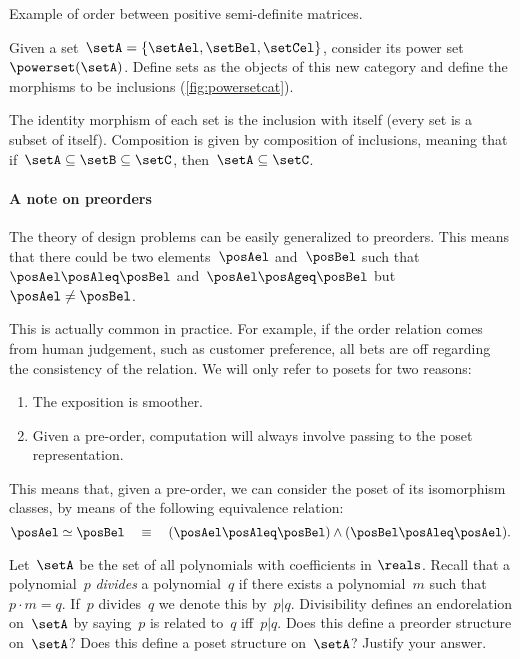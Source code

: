 \begin{marginfigure}
    \centering
    \caption{Example of order between positive semi-definite matrices.}
    \label{fig:posdef_hasse}
\end{marginfigure}

\begin{example}
    \label{ex:hasseinclusion}
    Given a set~$\setA=\{\setAel,\setBel,\setCel\}$, consider its power set~$\powerset(\setA)$.
    Define sets as the objects of this new category and define the morphisms to be inclusions (\cref{fig:powersetcat}).

    The identity morphism of each set is the inclusion with itself (every set is a subset of itself).
    Composition is given by composition of inclusions, meaning that if~$\setA\subseteq \setB \subseteq \setC$, then~$\setA\subseteq \setC$.
\end{example}

\paragraph{A note on preorders}
The theory of design problems can be easily generalized to preorders.
This means that there could be two elements~$\posAel$ and~$\posBel$ such that~$\posAel\posAleq \posBel$ and~$\posAel \posAgeq \posBel$ but~$\posAel \neq \posBel$.

This is actually common in practice.
For example, if the order relation comes from human judgement, such as customer preference, all bets are off regarding the consistency of the relation.
We will only refer to posets for two reasons:
\begin{enumerate}
    \item The exposition is smoother.
    \item Given a pre-order, computation will always involve passing to the poset representation.
\end{enumerate}
This means that, given a pre-order, we can consider the poset of its isomorphism classes, by means of the following equivalence relation:
\begin{equation}
    \posAel \simeq \posBel \quad \equiv \quad (\posAel \posAleq \posBel) \wedge (\posBel \posAleq \posAel).
\end{equation}
%

\begin{gradedexercise}
    \label{ex:PolynomialDivisibility}
    Let~$\setA$ be the set of all polynomials with coefficients in $\reals$.
    Recall that a polynomial~$p$ \emph{divides} a polynomial~$q$ if there exists a polynomial~$m$ such that~$p \cdot m = q$.
    If~$p$ divides~$q$ we denote this by~$p \vert q$.
    Divisibility defines an endorelation on~$\setA$ by saying~$p$ is related to~$q$ iff~$p \vert q$.
    Does this define a preorder structure on~$\setA$?
    Does this define a poset structure on~$\setA$?
    Justify your answer.
\end{gradedexercise}

